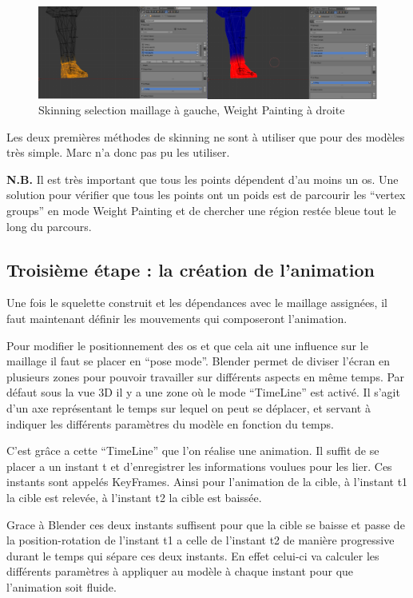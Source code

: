 \documentclass[11pt]{report}
\begin{document}
\begin{figure}[htbp]
\centering
\includegraphics[scale=0.8]{skinning.png}
\caption{Skinning selection maillage à gauche, Weight Painting à droite}
\end{figure}

Les deux premières méthodes de skinning ne sont à utiliser que pour des modèles très simple. Marc n’a donc pas pu les utiliser.

\noindent\textbf{N.B.} Il est très important que tous les points dépendent d’au moins un os. Une solution pour vérifier que tous les points ont un poids est de parcourir les ``vertex groups'' en mode Weight Painting et de chercher une région restée bleue tout le long du parcours.

\subsection{Troisième étape : la création de l’animation}

Une fois le squelette construit et les dépendances avec le maillage assignées, il faut maintenant définir les mouvements qui composeront l’animation.

Pour modifier le positionnement des os et que cela ait une influence sur le maillage il faut se placer en ``pose mode''.  Blender permet de diviser l’écran en plusieurs zones pour pouvoir travailler sur différents aspects en même temps. Par défaut sous la vue 3D il y a une zone où le mode ``TimeLine'' est activé. Il s’agit d’un axe représentant le temps sur lequel on peut se déplacer, et servant à indiquer les différents paramètres du modèle en fonction du temps.

C’est grâce a cette ``TimeLine'' que l’on réalise une animation. Il suffit de se placer a un instant t et d’enregistrer les informations voulues pour les lier. Ces instants sont appelés KeyFrames. Ainsi pour l’animation de la cible, à l’instant t1 la cible est relevée, à l’instant t2 la cible est baissée.

Grace à Blender ces deux instants suffisent pour que la cible se baisse et passe de la position-rotation de l’instant t1 a celle de l’instant t2 de manière progressive durant le temps qui sépare ces deux instants. En effet celui-ci va calculer les différents paramètres  à appliquer au modèle à chaque instant pour que l’animation soit fluide.
\end{document}
